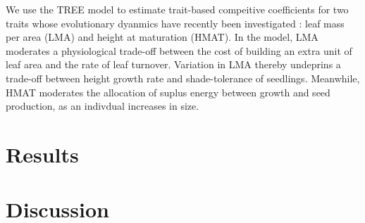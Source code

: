 \documentclass[a4paper,11pt]{article}
\begin{document}
We use the TREE model to estimate trait-based compeitive coefficients for
two traits whose evolutionary dyanmics have recently been investigated
\citet{Falster-2015}: leaf mass per area (LMA) and height at maturation
(HMAT). In the model, LMA moderates a physiological trade-off between the cost
of building an extra unit of leaf area and the rate of leaf turnover.
Variation in LMA thereby undeprins a trade-off between height growth rate and
shade-tolerance of seedlings. Meanwhile, HMAT moderates the allocation of
suplus energy between growth and seed production, as an indivdual increases in
size.

\clearpage

\section{Results}

\clearpage
\section{Discussion}
\end{document}
